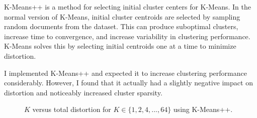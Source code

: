 \documentclass{article} %
\begin{document}
K-Means++ is a method for selecting initial cluster centers for K-Means. In the normal version of K-Means, initial cluster centroids are selected by sampling random documents from the dataset. This can produce suboptimal clusters, increase time to convergence, and increase variability in clustering performance. K-Means solves this by selecting initial centroids one at a time to minimize distortion.

I implemented K-Means++ and expected it to increase clustering performance considerably. However, I found that it actually had a slightly negative impact on distortion and noticeably increased cluster sparsity. 

\begin{figure}[h]
\begin{center}
\end{center}
\caption{$K$ versus total distortion for $K \in \{1,2,4,...,64\}$ using K-Means++.}
\end{figure}
\end{document}
